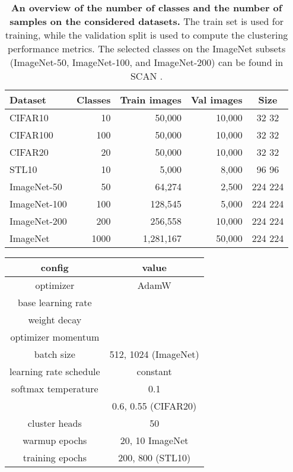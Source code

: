 \documentclass{bmvc2k}
\begin{document}
\begin{table}[t]
\begin{center}
\begin{tabular}{lrrrc}
\toprule
\textbf{Dataset} & \textbf{Classes} & \textbf{Train images} & \textbf{Val images} & \textbf{Size}\\ 
\midrule
CIFAR10 & 10 & 50,000 & 10,000 & 32  32\\
CIFAR100 & 100 & 50,000 & 10,000 & 32  32\\
CIFAR20 & 20 & 50,000 & 10,000 & 32  32\\
STL10 & 10 & 5,000 & 8,000 & 96  96\\
ImageNet-50 & 50 & 64,274 & 2,500 & 224  224\\
ImageNet-100 & 100 & 128,545 & 5,000 & 224  224\\
ImageNet-200 & 200 & 256,558 & 10,000 & 224  224\\
ImageNet & 1000 & 1,281,167 & 50,000 & 224  224\\
\bottomrule
\end{tabular}
\end{center}
\caption{\textbf{An overview of the number of classes and the number of samples on the considered datasets.} The train set is used for training, while the validation split is used to compute the clustering performance metrics. The selected classes on the ImageNet \cite{deng2009imagenet} subsets (ImageNet-50, ImageNet-100, and ImageNet-200) can be found in SCAN \cite{scan}.}
\label{tab:datasets-info}
\end{table} \begin{table}[b]
\begin{center}
\label{tab:pretrain-hp} 
    \begin{tabular}{cc}
\toprule
config & value \\
\hline
optimizer & AdamW \\
base learning rate &  \\
weight decay &  \\
optimizer momentum &  \\
batch size & 512, 1024 (ImageNet)  \\
learning rate schedule & constant \\
softmax temperature  & 0.1 \\
 & 0.6, 0.55 (CIFAR20) \\
cluster heads & 50 \\
warmup epochs & 20, 10 ImageNet \\
training epochs & 200, 800 (STL10) \\

\end{tabular}
\end{center}
\end{table}
\end{document}
